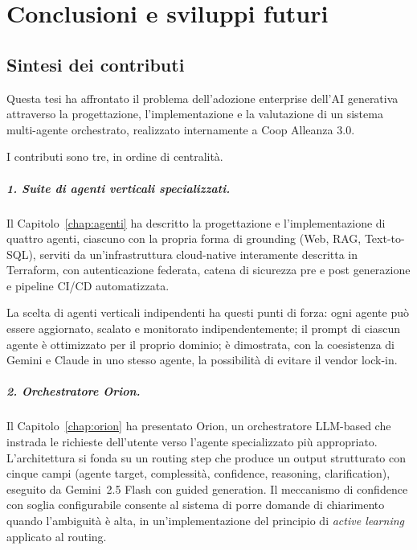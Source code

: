 
\chapter{Conclusioni e sviluppi futuri}
\label{chap:conclusioni}

\section{Sintesi dei contributi}
\label{sec:concl-sintesi}

Questa tesi ha affrontato il problema dell'adozione enterprise dell'AI generativa attraverso la progettazione, 
l'implementazione e la valutazione di un sistema multi-agente orchestrato, realizzato internamente a Coop Alleanza 3.0. 

I contributi sono tre, in ordine di centralità.

\paragraph{1. Suite di agenti verticali specializzati.} Il Capitolo~\ref{chap:agenti} ha descritto la progettazione e l'implementazione di quattro agenti,
ciascuno con la propria forma di grounding (Web, RAG, Text-to-SQL), serviti da un'infrastruttura cloud-native interamente descritta in Terraform, 
con autenticazione federata, catena di sicurezza pre e post generazione e pipeline CI/CD automatizzata.

La scelta di agenti verticali indipendenti ha questi punti di forza: ogni agente può essere aggiornato, scalato e monitorato indipendentemente; 
il prompt di ciascun agente è ottimizzato per il proprio dominio; è dimostrata, con la coesistenza di Gemini e Claude in uno stesso agente,
la possibilità di evitare il vendor lock-in.

\paragraph{2. Orchestratore Orion.} Il Capitolo~\ref{chap:orion} ha presentato Orion,
un orchestratore LLM-based che instrada le richieste dell'utente verso l'agente specializzato più appropriato. 
L'architettura si fonda su un routing step che produce un output strutturato con cinque campi (agente target, complessità, confidence, reasoning, clarification), 
eseguito da Gemini~2.5 Flash con guided generation. Il meccanismo di confidence con soglia configurabile consente al sistema di porre domande di chiarimento quando l'ambiguità è alta, 
in un'implementazione del principio di \emph{active learning} applicato al routing.

